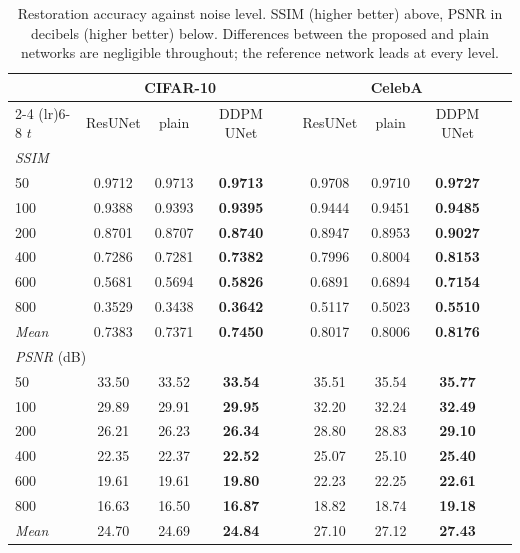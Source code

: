 \begin{table}[htbp]
    \centering
    \caption{Restoration accuracy against noise level. SSIM (higher better) above, PSNR in decibels
    (higher better) below. Differences between the proposed and plain networks are negligible
    throughout; the reference network leads at every level.}
    \label{tab:ssim}
    \begin{tabular}{lcccccccc}
        \toprule
        & \multicolumn{3}{c}{CIFAR-10} & & \multicolumn{3}{c}{CelebA} \\
        \cmidrule(lr){2-4} \cmidrule(lr){6-8}
        $t$ & ResUNet & plain & DDPM UNet & & ResUNet & plain & DDPM UNet \\
        \midrule
        \multicolumn{8}{l}{\emph{SSIM}} \\
        50  & 0.9712 & 0.9713 & \textbf{0.9713} & & 0.9708 & 0.9710 & \textbf{0.9727} \\
        100 & 0.9388 & 0.9393 & \textbf{0.9395} & & 0.9444 & 0.9451 & \textbf{0.9485} \\
        200 & 0.8701 & 0.8707 & \textbf{0.8740} & & 0.8947 & 0.8953 & \textbf{0.9027} \\
        400 & 0.7286 & 0.7281 & \textbf{0.7382} & & 0.7996 & 0.8004 & \textbf{0.8153} \\
        600 & 0.5681 & 0.5694 & \textbf{0.5826} & & 0.6891 & 0.6894 & \textbf{0.7154} \\
        800 & 0.3529 & 0.3438 & \textbf{0.3642} & & 0.5117 & 0.5023 & \textbf{0.5510} \\
        \emph{Mean} & 0.7383 & 0.7371 & \textbf{0.7450} & & 0.8017 & 0.8006 & \textbf{0.8176} \\
        \midrule
        \multicolumn{8}{l}{\emph{PSNR} (dB)} \\
        50  & 33.50 & 33.52 & \textbf{33.54} & & 35.51 & 35.54 & \textbf{35.77} \\
        100 & 29.89 & 29.91 & \textbf{29.95} & & 32.20 & 32.24 & \textbf{32.49} \\
        200 & 26.21 & 26.23 & \textbf{26.34} & & 28.80 & 28.83 & \textbf{29.10} \\
        400 & 22.35 & 22.37 & \textbf{22.52} & & 25.07 & 25.10 & \textbf{25.40} \\
        600 & 19.61 & 19.61 & \textbf{19.80} & & 22.23 & 22.25 & \textbf{22.61} \\
        800 & 16.63 & 16.50 & \textbf{16.87} & & 18.82 & 18.74 & \textbf{19.18} \\
        \emph{Mean} & 24.70 & 24.69 & \textbf{24.84} & & 27.10 & 27.12 & \textbf{27.43} \\
        \bottomrule
    \end{tabular}
\end{table}

